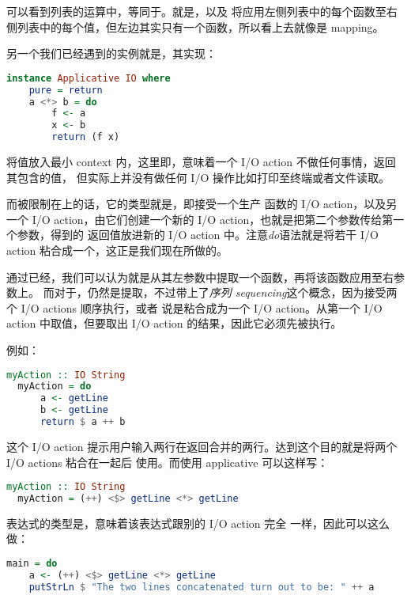 \documentclass[./main.tex]{subfiles}
\begin{document}
可以看到列表的运算中，等同于。就是\acode{[f]}，以及
将应用左侧列表中的每个函数至右侧列表中的每个值，但左边其实只有一个函数，所以看上去就像是 mapping。

另一个我们已经遇到的实例就是，其实现：

\begin{lstlisting}[language=Haskell]
  instance Applicative IO where
    pure = return
    a <*> b = do
        f <- a
        x <- b
        return (f x)
\end{lstlisting}

将值放入最小 context 内，这里即，意味着一个 I/O action 不做任何事情，返回其包含的值，
但实际上并没有做任何 I/O 操作比如打印至终端或者文件读取。

而\acode{<*>}被限制在上的话，它的类型就是，即接受一个生产
函数的 I/O action，以及另一个 I/O action，由它们创建一个新的 I/O action，也就是把第二个参数传给第一个参数，得到的
返回值放进新的 I/O action 中。注意\textit{do}语法就是将若干 I/O action 粘合成一个，这正是我们现在所做的。

通过已经\acode{[]}，我们可以认为\acode{<*>}就是从其左参数中提取一个函数，再将该函数应用至右参数上。
而对于，仍然是提取，不过带上了\textit{序列 sequencing}这个概念，因为接受两个 I/O actions 顺序执行，或者
说是粘合成为一个 I/O action。从第一个 I/O action 中取值，但要取出 I/O action 的结果，因此它必须先被执行。

例如：

\begin{lstlisting}[language=Haskell]
  myAction :: IO String
  myAction = do
      a <- getLine
      b <- getLine
      return $ a ++ b
\end{lstlisting}

这个 I/O action 提示用户输入两行在返回合并的两行。达到这个目的就是将两个 I/O actions 粘合在一起后
使用。而使用 applicative 可以这样写：

\begin{lstlisting}[language=Haskell]
  myAction :: IO String
  myAction = (++) <$> getLine <*> getLine
\end{lstlisting}

表达式的类型是，意味着该表达式跟别的 I/O action 完全
一样，因此可以这么做：

\begin{lstlisting}[language=Haskell]
  main = do
    a <- (++) <$> getLine <*> getLine
    putStrLn $ "The two lines concatenated turn out to be: " ++ a
\end{lstlisting}
\end{document}
